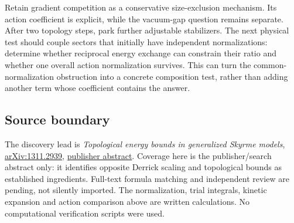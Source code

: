 \documentclass[11pt,a4paper]{article}
\begin{document}
Retain gradient competition as a conservative size-exclusion mechanism.
Its action coefficient is explicit, while the vacuum-gap question
remains separate. After two topology steps, park further adjustable
stabilizers. The next physical test should couple sectors that initially
have independent normalizations: determine whether reciprocal energy
exchange can constrain their ratio and whether one overall action
normalization survives. This can turn the common-normalization
obstruction into a concrete composition test, rather than adding another
term whose coefficient contains the answer.

\hypertarget{source-boundary}{%
\subsection{Source boundary}\label{source-boundary}}

The discovery lead is \emph{Topological energy bounds in generalized
Skyrme models}, \href{https://arxiv.org/abs/1311.2939}{arXiv:1311.2939},
\href{https://journals.aps.org/prd/abstract/10.1103/PhysRevD.89.065010}{publisher
abstract}. Coverage here is the publisher/search abstract only: it
identifies opposite Derrick scaling and topological bounds as
established ingredients. Full-text formula matching and independent
review are pending, not silently imported. The normalization, trial
integrals, kinetic expansion and action comparison above are written
calculations. No computational verification scripts were used.
\end{document}
